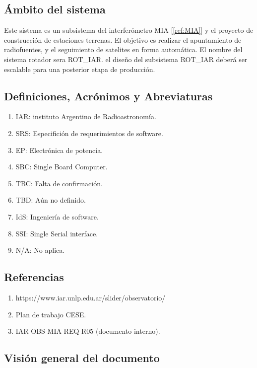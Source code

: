 \documentclass[12pt,a4paper, twosite]{article}
\begin{document}
	
	\subsection{Ámbito del sistema}
	\label{sec:org12e44a1}
	Este sistema es un subsistema del interferómetro MIA [\ref{ref:MIA}] y el proyecto de construcción de estaciones terrenas. El objetivo es realizar el apuntamiento de radiofuentes, y el seguimiento de satelites en forma automática.  El nombre del sistema rotador sera ROT\_IAR. el diseño del subsistema ROT\_IAR deberá ser escalable para una posterior etapa de producción.
	
	
	\subsection{Definiciones, Acrónimos y Abreviaturas}
	\label{sec:orgb158e36}
	\begin{enumerate}
		\item IAR: instituto Argentino de Radioastronomía.  
		\item SRS: Especifición de requerimientos de software.  
		\item EP: Electrónica de potencia.
		\item SBC: Single Board Computer.
		\item TBC: Falta de confirmación.
		\item TBD: Aún no definido.
		\item IdS: Ingeniería de software.
		\item SSI: Single Serial interface.
		
		\item N/A: No aplica.  
	
		  
		
	\end{enumerate}
	
	
	
	\subsection{Referencias}
	\label{sec:org62711e0}
	\begin{enumerate}
		\item \label{ref:MIA}https://www.iar.unlp.edu.ar/slider/observatorio/
		\item \label{ref:ptr} Plan de trabajo CESE.
		\item \label{ref:ptr} IAR-OBS-MIA-REQ-R05 (documento interno).
\end{enumerate}
	
	\subsection{Visión general del documento}
	\label{sec:orgdaca22c}
	
\end{document}
